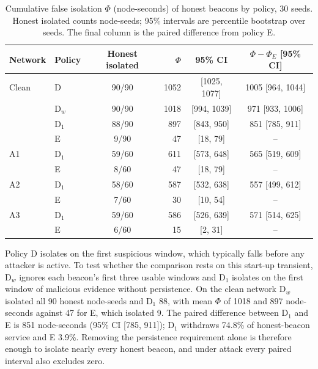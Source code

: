 \begin{table}[!t]
\caption{Cumulative false isolation $\Phi$ (node-seconds) of honest beacons by
policy, 30 seeds. Honest isolated counts node-seeds; 95\% intervals are
percentile bootstrap over seeds. The final column is the paired difference from
policy E.}
\label{tab:phivariants}
\centering
\footnotesize
\setlength{\tabcolsep}{4pt}
\begin{tabular}{@{}llcrcc@{}}
\toprule
Network & Policy & Honest isolated & $\Phi$ & 95\% CI & $\Phi - \Phi_E$ [95\% CI] \\
\midrule
Clean & D     & 90/90 & 1052 & [1025, 1077] & 1005 [964, 1044] \\
      & D$_w$ & 90/90 & 1018 & [994, 1039]  & 971 [933, 1006] \\
      & D$_1$ & 88/90 & 897  & [843, 950]   & 851 [785, 911] \\
      & E     & 9/90  & 47   & [18, 79]     & -- \\
A1    & D$_1$ & 59/60 & 611  & [573, 648]   & 565 [519, 609] \\
      & E     & 8/60  & 47   & [18, 79]     & -- \\
A2    & D$_1$ & 58/60 & 587  & [532, 638]   & 557 [499, 612] \\
      & E     & 7/60  & 30   & [10, 54]     & -- \\
A3    & D$_1$ & 59/60 & 586  & [526, 639]   & 571 [514, 625] \\
      & E     & 6/60  & 15   & [2, 31]      & -- \\
\bottomrule
\end{tabular}
\end{table}

Policy D isolates on the first suspicious window, which typically falls before
any attacker is active. To test whether the comparison rests on this start-up
transient, D$_w$ ignores each beacon's first three usable windows and D$_1$
isolates on the first window of malicious evidence without persistence. On the
clean network D$_w$ isolated all 90 honest node-seeds and D$_1$ 88, with mean
$\Phi$ of 1018 and 897 node-seconds against 47 for E, which isolated 9. The
paired difference between D$_1$ and E is 851 node-seconds (95\% CI
[785, 911]); D$_1$ withdraws 74.8\% of honest-beacon service and E 3.9\%.
Removing the persistence requirement alone is therefore enough to isolate
nearly every honest beacon, and under attack every paired interval also
excludes zero.

